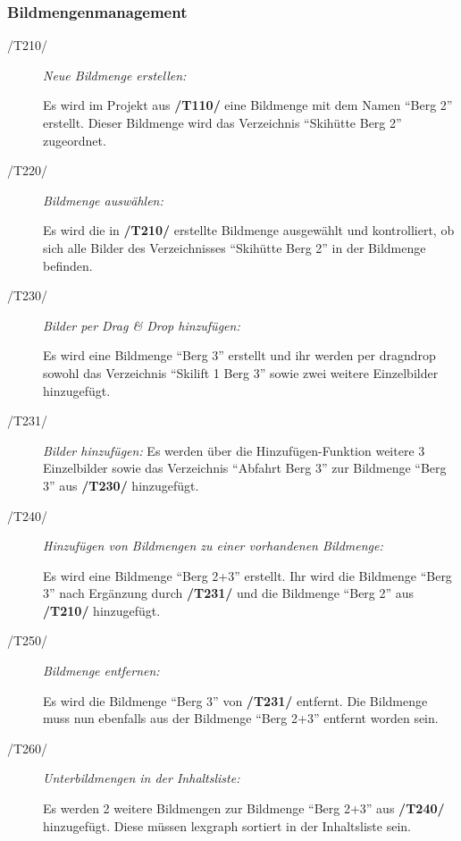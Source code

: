 	\subsubsection{Bildmengenmanagement}
		
		\begin{description}
		
			\item[/T210/] \textit{Neue Bildmenge erstellen:}\par Es wird im Projekt aus \textbf{/T110/} eine Bildmenge mit dem Namen "`Berg 2"' erstellt. Dieser Bildmenge wird das Verzeichnis "`Skihütte Berg 2"' zugeordnet.
				
			\item[/T220/] \textit{Bildmenge auswählen:}\par Es wird die in \textbf{/T210/} erstellte Bildmenge ausgewählt und kontrolliert, ob sich alle Bilder des Verzeichnisses "`Skihütte Berg 2"' in der Bildmenge befinden.

			\item[/T230/] \textit{Bilder per Drag \& Drop hinzufügen:}\par Es wird eine Bildmenge "`Berg 3"' erstellt und ihr werden per \gls{dragndrop} sowohl das Verzeichnis "`Skilift 1 Berg 3"' sowie zwei weitere Einzelbilder hinzugefügt.
			
			\item[/T231/] \textit{Bilder hinzufügen:} Es werden über die Hinzufügen-Funktion weitere 3 Einzelbilder sowie das Verzeichnis "`Abfahrt Berg 3"' zur Bildmenge "`Berg 3"' aus \textbf{/T230/} hinzugefügt.
			
			\item[/T240/] \textit{Hinzufügen von Bildmengen zu einer vorhandenen Bildmenge:}\par Es wird eine Bildmenge "`Berg 2+3"' erstellt. Ihr wird die Bildmenge "`Berg 3"' nach Ergänzung durch \textbf{/T231/} und die Bildmenge "`Berg 2"' aus \textbf{/T210/} hinzugefügt.
				
			\item[/T250/] \textit{Bildmenge entfernen:}\par Es wird die Bildmenge "`Berg 3"' von \textbf{/T231/} entfernt. Die Bildmenge muss nun ebenfalls aus der Bildmenge "`Berg 2+3"' entfernt worden sein.
			
			\item[/T260/] \textit{Unterbildmengen in der Inhaltsliste:}\par Es werden 2 weitere Bildmengen zur Bildmenge "`Berg 2+3"' aus \textbf{/T240/} hinzugefügt. Diese müssen \gls{lexgraph} sortiert in der Inhaltsliste sein.
			

\end{description}
